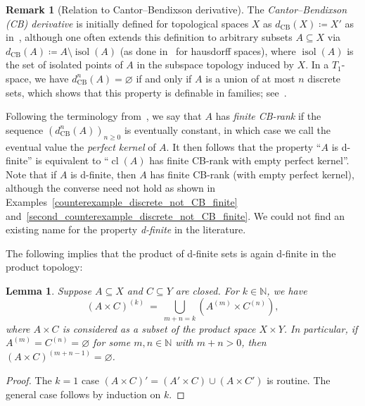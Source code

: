 \documentclass[11pt]{amsart}
\theoremstyle{plain}
\newtheorem{lemma}[thm]{Lemma}
\theoremstyle{definition}
\newtheorem{remark}[thm]{Remark}
\numberwithin{equation}{section}
\newcommand\N{\mathbb{N}}
\newcommand\0{\varnothing}
\DeclareMathOperator\cl{cl}
\begin{document}
\begin{remark}[Relation to Cantor--Bendixson derivative]\label{CB_remark}
The \emph{Cantor--Bendixson (CB) derivative} is initially defined for topological spaces $X$ as $d_{\operatorname{CB}}(X)\coloneqq X'$ as in~\cite[(6.10)]{kechris2012classical}, although one often extends this definition to arbitrary subsets $A\subseteq X$ via $d_{\operatorname{CB}}(A)\coloneqq A\setminus\operatorname{isol}(A)$ (as done in~\cite[3.28]{fornasiero2021dminimalstructures} for hausdorff spaces), where $\operatorname{isol}(A)$ is the set of isolated points of $A$ in the subspace topology induced by $X$. 
In a $T_1$-space, we have $d_{\operatorname{CB}}^n(A) = \varnothing$ if and only if $A$ is a union of at most $n$ discrete sets, which shows that this property is definable in families; see~\cite[3.29]{fornasiero2021dminimalstructures}.


Following the terminology from~\cite{kechris2012classical}, we say that $A$ has \emph{finite CB-rank} if the sequence $(d_{\operatorname{CB}}^n(A))_{n\geq 0}$ is eventually constant, in which case we call the eventual value the \emph{perfect kernel} of $A$. 
It then follows that the property ``$A$ is d-finite'' is equivalent to ``$\cl(A)$ has finite CB-rank with empty perfect kernel''. 
Note that if $A$ is d-finite, then $A$ has finite CB-rank (with empty perfect kernel), although the converse need not hold as shown in Examples~\ref{counterexample_discrete_not_CB_finite} and~\ref{second_counterexample_discrete_not_CB_finite}. We could not find an existing name for the property \emph{d-finite} in the literature.
\end{remark}


\noindent
The following implies that the product of d-finite sets is again d-finite in the product topology:

\begin{lemma}\label{CBproduct1}
Suppose $A \subseteq X$ and $C\subseteq Y$ are closed. For $k \in \N$, we have 
\[
\textstyle
(A\times C)^{(k)}\ =\ \bigcup_{m+n=k}(A^{(m)}\times C^{(n)}),
\]
where $A\times C$ is considered as a subset of the product space $X\times Y$. In particular, if $A^{(m)} = C^{(n)}= \varnothing$ for some $m,n \in \N$ with $m+n>0$, then $(A\times C)^{(m+n-1)}= \varnothing$.
\end{lemma}
\begin{proof}
The $k=1$ case $(A\times C)'=(A'\times C)\cup (A\times C')$ is routine. The general case follows by induction on $k$.
\end{proof}
\end{document}
